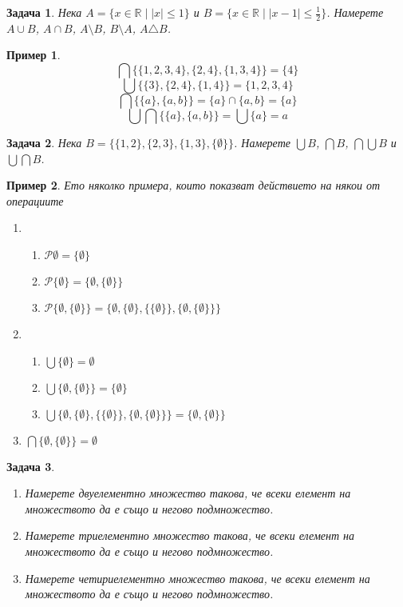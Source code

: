 \documentclass[a4paper]{article}
\newtheorem{problem}{Задача}
\newtheorem{example}{Пример}
\newcommand{\R}{\mathbb{R}}
\newcommand{\Ps}{\mathscr{P}}
\begin{document}
\begin{problem}
  Нека $A = \{x\in\R\mid |x|\leq 1\}$ и $B = \{x\in\R\mid |x-1|\leq \frac{1}{2}\}$.
  Намерете $A\cup B$, $A\cap B$, $A\setminus B$, $B\setminus A$, $A\triangle B$.
\end{problem}



\begin{example}
  \[\bigcap\{\{1,2,3,4\},\{2,4\},\{1,3,4\}\} = \{4\}\]
  \[\bigcup\{\{3\},\{2,4\},\{1,4\}\} = \{1,2,3,4\}\]
  \[\bigcap\{\{a\},\{a,b\}\} = \{a\}\cap\{a,b\} = \{a\}\]
  \[\bigcup\bigcap\{\{a\},\{a,b\}\}  = \bigcup\{a\} = a\]
\end{example}


\begin{problem}
  Нека $B = \{\{1,2\},\{2,3\}, \{1,3\}, \{\emptyset\}\}$.
  Намерете $\bigcup{B}$, $\bigcap{B}$, $\bigcap\bigcup{B}$ и $\bigcup\bigcap{B}$.
\end{problem}


\begin{example}
  Ето няколко примера, които показват действието на някои от операциите
  \begin{enumerate}[1)]
  \item
    \begin{enumerate}[]
    \item
      $\Ps\emptyset = \{\emptyset\}$
    \item
      $\Ps\{\emptyset\} = \{\emptyset,\{\emptyset\}\}$
    \item
      $\Ps\{\emptyset,\{\emptyset\}\} = \{\emptyset,\{\emptyset\},\{\{\emptyset\}\}, \{\emptyset,\{\emptyset\}\}\}$
    \end{enumerate}
  \item
    \begin{enumerate}[]
    \item
      $\bigcup\{\emptyset\} = \emptyset$
    \item
      $\bigcup\{\emptyset,\{\emptyset\}\} = \{\emptyset\}$
    \item      
      $\bigcup\{\emptyset,\{\emptyset\},\{\{\emptyset\}\}, \{\emptyset,\{\emptyset\}\}\} = \{\emptyset,\{\emptyset\}\}$
    \end{enumerate}
  \item
    $\bigcap\{\emptyset,\{\emptyset\}\} = \emptyset$
\end{enumerate}
\end{example}



\begin{problem}
  \begin{enumerate}
  \item
    Намерете двуелементно множество такова, че всеки елемент на множеството да е също и негово подмножество.
  \item
    Намерете триелементно множество такова, че всеки елемент на множеството да е също и негово подмножество.
  \item
    Намерете четириелементно множество такова, че всеки елемент на множеството да е също и негово подмножество.
\end{enumerate}
\end{problem}
\end{document}
